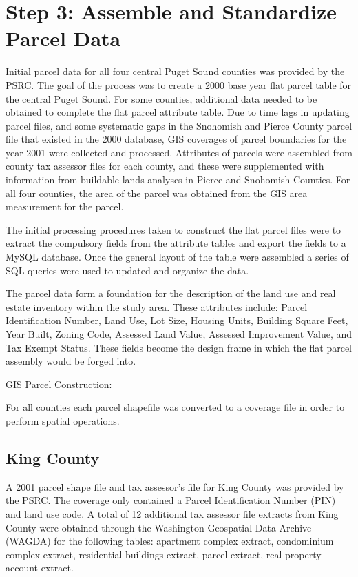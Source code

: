 \section{Step 3: Assemble and Standardize Parcel Data}

Initial parcel data for all four central Puget Sound counties was
provided by the PSRC.  The goal of the process was to create a
2000 base year flat parcel table for the central Puget Sound. For
some counties, additional data needed to be obtained to complete
the flat parcel attribute table.  Due to time lags in updating
parcel files, and some systematic gaps in the Snohomish and Pierce
County parcel file that existed in the 2000 database, GIS
coverages of parcel boundaries for the year 2001 were collected
and processed. Attributes of parcels were assembled from county
tax assessor files for each county, and these were supplemented
with information from buildable lands analyses in Pierce and
Snohomish Counties.  For all four counties, the area of the parcel
was obtained from the GIS area measurement for the parcel.

The initial processing procedures taken to construct the flat
parcel files were to extract the compulsory fields from the
attribute tables and export the fields to a MySQL database. Once
the general layout of the table were assembled a series of SQL
queries were used to updated and organize the data.

The parcel data form a foundation for the description of the land
use and real estate inventory within the study area. These
attributes include: Parcel Identification Number, Land Use, Lot
Size, Housing Units, Building Square Feet, Year Built, Zoning
Code, Assessed Land Value, Assessed Improvement Value, and Tax
Exempt Status. These fields become the design frame in which the
flat parcel assembly would be forged into.


GIS Parcel Construction:

For all counties each parcel shapefile was converted to a coverage
file in order to perform spatial operations.

\subsection{King County}

A 2001 parcel shape file and tax assessor's file for King County
was provided by the PSRC.  The coverage only contained a Parcel
Identification Number (PIN) and land use code.  A total of 12
additional tax assessor file extracts from King County were
obtained through the Washington Geospatial Data Archive (WAGDA)
for the following tables: apartment complex extract, condominium
complex extract, residential buildings extract, parcel extract,
real property account extract.

